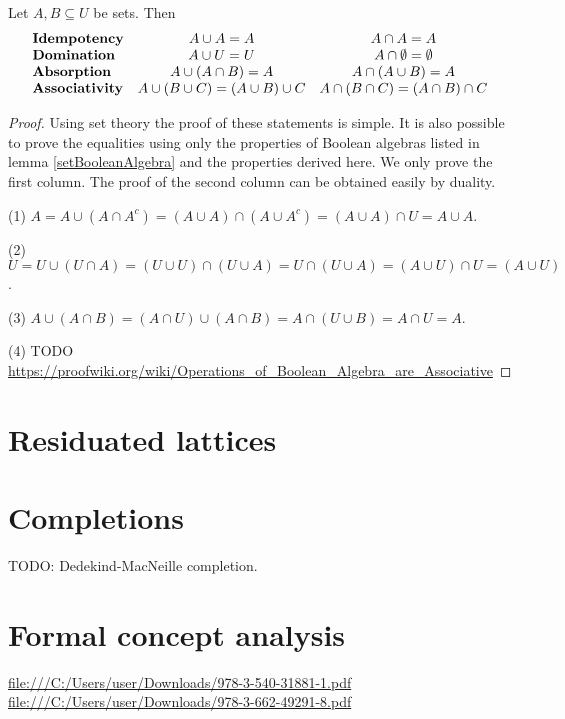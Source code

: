\begin{corollary} \label{BooleanConsequences}
Let $A,B\subseteq U$ be sets. Then
\[ \begin{array}{l c c}
\text{\textbf{Idempotency}} & A\cup A = A & A\cap A = A \\
\text{\textbf{Domination}} & A\cup U = U & A\cap \emptyset = \emptyset \\
\text{\textbf{Absorption}} & A\cup(A\cap B) = A & A\cap(A\cup B) = A \\
\text{\textbf{Associativity}} & A\cup(B\cup C) = (A\cup B)\cup C & A\cap(B\cap C) = (A\cap B)\cap C
\end{array} \]
\end{corollary}
\begin{proof}
Using set theory the proof of these statements is simple. It is also possible to prove the equalities using only the properties of Boolean algebras listed in lemma \ref{setBooleanAlgebra} and the properties derived here. We only prove the first column. The proof of the second column can be obtained easily by duality.

(1) $A = A\cup(A\cap A^c) = (A\cup A)\cap (A\cup A^c) = (A\cup A)\cap U = A\cup A$.

(2) $U = U\cup (U\cap A) = (U\cup U)\cap (U\cup A) = U\cap (U\cup A) = (A\cup U)\cap U = (A\cup U)$.

(3) $A\cup(A\cap B) = (A\cap U)\cup(A\cap B) = A\cap(U\cup B) = A\cap U = A$.

(4) TODO \url{https://proofwiki.org/wiki/Operations_of_Boolean_Algebra_are_Associative}
\end{proof}

\section{Residuated lattices}


\section{Completions}
TODO: Dedekind-MacNeille completion.

\section{Formal concept analysis}
\url{file:///C:/Users/user/Downloads/978-3-540-31881-1.pdf}
\url{file:///C:/Users/user/Downloads/978-3-662-49291-8.pdf}

